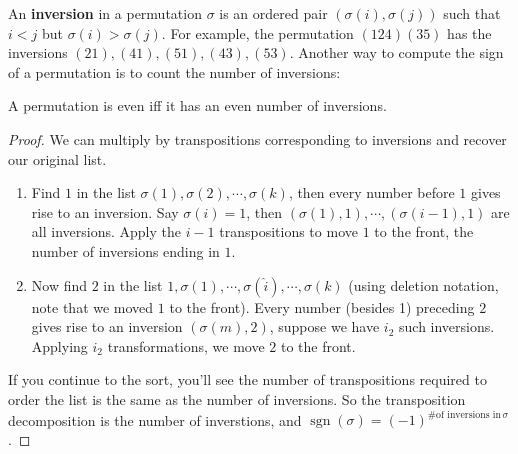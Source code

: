 An \textbf{inversion} in a permutation $\sigma$ is an ordered pair $(\sigma(i),\sigma(j))$ such that $i<j$ but $\sigma(i)>\sigma(j)$. For example, the permutation $(124)(35)$ has the inversions $(21),(41),(51),(43),(53)$. Another way to compute the sign of a permutation is to count the number of inversions:
\begin{prop}
    A permutation is even iff it has an even number of inversions.
\end{prop}
\begin{proof}
    We can multiply by transpositions corresponding to inversions and recover our original list. 
    \begin{enumerate}[label=(\arabic*)]
        \item Find $1$ in the list $\sigma(1),\sigma(2),\cdots ,\sigma(k)$, then every number before $1$ gives rise to an inversion. Say $\sigma(i)=1$, then $(\sigma(1),1),\cdots ,(\sigma(i-1),1)$ are all inversions. Apply the $i-1$ transpositions to move $1$ to the front, the number of inversions ending in $1$.
        \item Now find $2$ in the list $1,\sigma(1),\cdots ,\sigma(\hat{i}),\cdots ,\sigma(k)$ (using deletion notation, note that we moved $1$ to the front). Every number (besides 1) preceding $2$ gives rise to an inversion $(\sigma(m),2)$, suppose we have $i_2$ such inversions. Applying $i_2$ transformations, we move $2$ to the front.
    \end{enumerate}
If you continue to the sort, you'll see the number of transpositions required to order the list is the same as the number of inversions. So the transposition decomposition is the number of inverstions, and $\operatorname{sgn}(\sigma)=(-1)^{\text{\# of inversions in} \,\sigma}$.
\end{proof}
